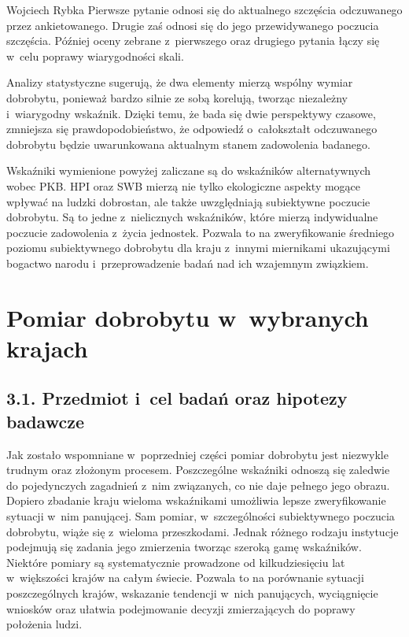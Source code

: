 \begin{artplenv}{Wojciech Rybka}
Pierwsze pytanie odnosi się do aktualnego szczęścia odczuwanego przez ankietowanego. Drugie zaś odnosi się do jego
przewidywanego poczucia szczęścia. Później oceny zebrane z~pierwszego oraz drugiego pytania łączy się w~celu poprawy
wiarygodności skali. 

Analizy statystyczne sugerują, że dwa elementy mierzą wspólny wymiar dobrobytu, ponieważ bardzo silnie ze sobą korelują,
tworząc niezależny i~wiarygodny wskaźnik. Dzięki temu, że bada się dwie perspektywy czasowe, zmniejsza się
prawdopodobieństwo, że odpowiedź o~całokształt odczuwanego dobrobytu będzie uwarunkowana aktualnym stanem zadowolenia
badanego.


Wskaźniki wymienione powyżej zaliczane są do wskaźników alternatywnych wobec PKB. HPI oraz SWB mierzą nie tylko
ekologiczne aspekty mogące wpływać na ludzki dobrostan, ale także uwzględniają subiektywne poczucie dobrobytu. Są to
jedne z~nielicznych wskaźników, które mierzą indywidualne poczucie zadowolenia z~życia jednostek. Pozwala to na
zweryfikowanie średniego poziomu subiektywnego dobrobytu dla kraju z~innymi miernikami ukazującymi bogactwo
narodu i~przeprowadzenie badań nad ich wzajemnym związkiem. 

\section{Pomiar dobrobytu w~wybranych krajach}
\baselineskip
\subsection{3.1. Przedmiot i~cel badań oraz hipotezy badawcze}
Jak zostało wspomniane w~poprzedniej części pomiar dobrobytu jest niezwykle trudnym oraz złożonym procesem. Poszczególne
wskaźniki odnoszą się zaledwie do pojedynczych zagadnień z~nim związanych, co nie daje pełnego jego obrazu. Dopiero
zbadanie kraju wieloma wskaźnikami umożliwia lepsze zweryfikowanie sytuacji w~nim panującej.
Sam pomiar, w~szczególności subiektywnego poczucia dobrobytu, wiąże się z~wieloma przeszkodami.
Jednak różnego rodzaju instytucje
podejmują się zadania jego zmierzenia tworząc szeroką gamę wskaźników. Niektóre pomiary są systematycznie prowadzone od
kilkudziesięciu lat w~większości krajów na całym świecie. Pozwala to na porównanie sytuacji poszczególnych krajów,
wskazanie tendencji w~nich panujących, wyciągnięcie wniosków oraz ułatwia podejmowanie decyzji zmierzających do poprawy
położenia ludzi. 


\end{artplenv}
